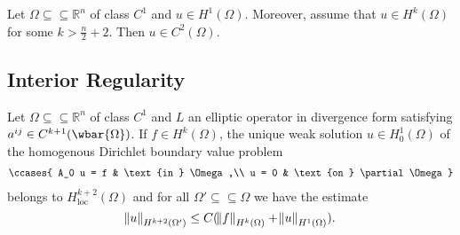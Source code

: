 \begin{corollary}
	Let $\Omega \subseteq \subseteq \mathbb{R}^n$ of class $C^1$ and $u \in H^1(\Omega)$. Moreover, assume that $u \in H^k(\Omega)$ for some $k > \frac{n}{2} + 2$. Then $u \in C^2(\Omega)$.
\end{corollary}

\subsection*{Interior Regularity}

\begin{theorem}
	Let $\Omega \subseteq \subseteq \mathbb{R}^n$ of class $C^1$ and $L$ an elliptic operator in divergence form satisfying $a^{ij} \in C^{k + 1}(\wbar{\Omega})$. If $f \in H^k(\Omega)$, the unique weak solution $u \in H^1_0(\Omega)$ of the homogenous Dirichlet boundary value problem
	\begin{align*}
		\ccases{
			A_0 u = f & \text{in } \Omega,\\
			u = 0 & \text{on } \partial\Omega
		}
	\end{align*}
	\noindent belongs to $H^{k + 2}_{\mathrm{loc}}(\Omega)$ and for all $\Omega' \subseteq \subseteq \Omega$ we have the estimate
	\begin{equation*}
		\norm{u}_{H^{k + 2}(\Omega')} \leq C(\norm{f}_{H^k(\Omega)} + \norm{u}_{H^1(\Omega)}).
	\end{equation*}
\end{theorem}

